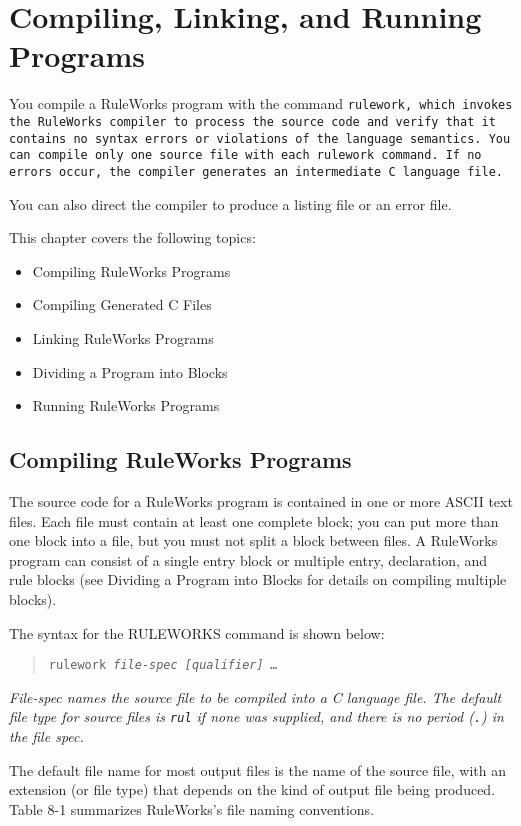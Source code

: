 \chapter{Compiling, Linking, and Running Programs}

You compile a RuleWorks program with the command
\tt{rulework}, which invokes the RuleWorks compiler to
process the source code and verify that it contains no
syntax errors or violations of the language semantics.
You can compile only one source file with each \tt{rulework}
command. If no errors occur, the compiler generates an
intermediate C language file.

You can also direct the compiler to produce a listing
file or an error file.

This chapter covers the following topics:
\begin{itemize}
\item Compiling RuleWorks Programs
\item Compiling Generated C Files
\item Linking RuleWorks Programs
\item Dividing a Program into Blocks
\item Running RuleWorks Programs
\end{itemize}

\section{Compiling RuleWorks Programs}

The source code for a RuleWorks program is contained in
one or more ASCII text files. Each file must contain at
least one complete block; you can put more than one block
into a file, but you must not split a block between
files. A RuleWorks program can consist of a single entry
block or multiple entry, declaration, and rule blocks
(see Dividing a Program into Blocks for details on
compiling multiple blocks).

The syntax for the RULEWORKS command is shown below:
\begin{quote}
\tt{rulework} \it{file-spec} [\it{qualifier}] \ldots
\end{quote}
\it{File-spec} names the source file to be compiled into a C
language file. The default file type for source files is
\verb|rul| if none was supplied, and there is no period (\verb|.|) in
the file spec.

The default file name for most output files is the name
of the source file, with an extension (or file type) that
depends on the kind of output file being produced. Table
8-1 summarizes RuleWorks's file naming conventions.

